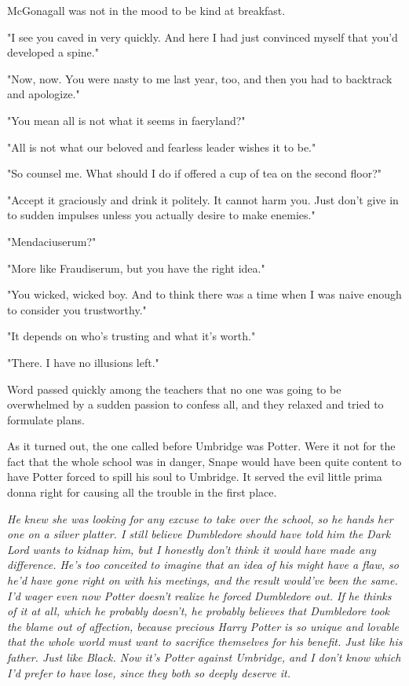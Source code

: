 McGonagall was not in the mood to be kind at breakfast.

"I see you caved in very quickly. And here I had just convinced myself that you'd developed a spine."

"Now, now. You were nasty to me last year, too, and then you had to backtrack and apologize."

"You mean all is not what it seems in faeryland?"

"All is not what our beloved and fearless leader wishes it to be."

"So counsel me. What should I do if offered a cup of tea on the second floor?"

"Accept it graciously and drink it politely. It cannot harm you. Just don't give in to sudden impulses unless you actually desire to make enemies."

"Mendaciuserum?"

"More like Fraudiserum, but you have the right idea."

"You wicked, wicked boy. And to think there was a time when I was naive enough to consider you trustworthy."

"It depends on who's trusting and what it's worth."

"There. I have no illusions left."

Word passed quickly among the teachers that no one was going to be overwhelmed by a sudden passion to confess all, and they relaxed and tried to formulate plans.

As it turned out, the one called before Umbridge was Potter. Were it not for the fact that the whole school was in danger, Snape would have been quite content to have Potter forced to spill his soul to Umbridge. It served the evil little prima donna right for causing all the trouble in the first place.

\emph{He knew she was looking for any excuse to take over the school, so he hands her one on a silver platter. I still believe Dumbledore should have told him the Dark Lord wants to kidnap him, but I honestly don't think it would have made any difference. He's too conceited to imagine that an idea of his might have a flaw, so he'd have gone right on with his meetings, and the result would've been the same. I'd wager even now Potter doesn't realize he forced Dumbledore out. If he thinks of it at all, which he probably doesn't, he probably believes that Dumbledore took the blame out of affection, because precious Harry Potter is so unique and lovable that the whole world must want to sacrifice themselves for his benefit. Just like his father. Just like Black. Now it's Potter against Umbridge, and I don't know which I'd prefer to have lose, since they both so deeply deserve it.}


